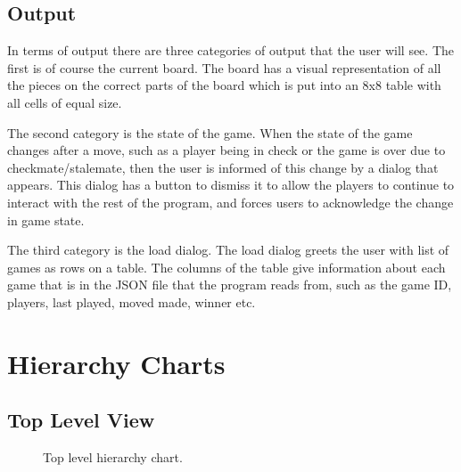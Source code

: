 \subsection{Output}
In terms of output there are three categories of output that the user will see. The first is of course the current board. The board has a visual representation of all the pieces on the correct parts of the board which is put into an 8x8 table with all cells of equal size. 

The second category is the state of the game. When the state of the game changes after a move, such as a player being in check or the game is over due to checkmate/stalemate, then the user is informed of this change by a dialog that appears. This dialog has a button to dismiss it to allow the players to continue to interact with the rest of the program, and forces users to acknowledge the change in game state.

The third category is the load dialog. The load dialog greets the user with list of games as rows on a table. The columns of the table give information about each game that is in the JSON file that the program reads from, such as the game ID, players, last played, moved made, winner etc. 
\section{Hierarchy Charts}
\subsection{Top Level View}
\begin{figure}[H]
	\centering
 	\caption{Top level hierarchy chart.}
\end{figure}
